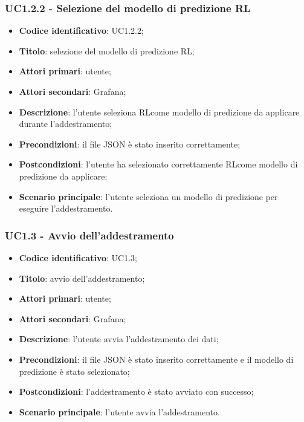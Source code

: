 \subsubsection{UC1.2.2 - Selezione del modello di predizione RL}
\begin{itemize}
	\item \textbf{Codice identificativo}: UC1.2.2;
	\item \textbf{Titolo}: selezione del modello di predizione RL\glo;
	\item \textbf{Attori primari}: utente;
	\item \textbf{Attori secondari}: Grafana\glo;
	\item \textbf{Descrizione}: l'utente seleziona RL\glosp come modello di predizione da applicare durante l'addestramento;
	\item \textbf{Precondizioni}: il file JSON è stato inserito correttamente;
	\item \textbf{Postcondizioni}: l'utente ha selezionato correttamente RL\glosp come modello di predizione da applicare;
	\item \textbf{Scenario principale}: l'utente seleziona un modello di predizione per eseguire l'addestramento.
\end{itemize}

\subsubsection{UC1.3 - Avvio dell'addestramento}
\begin{itemize}
	\item \textbf{Codice identificativo}: UC1.3;
	\item \textbf{Titolo}: avvio dell'addestramento;
	\item \textbf{Attori primari}: utente;
	\item \textbf{Attori secondari}: Grafana\glo;
	\item \textbf{Descrizione}: l'utente avvia l'addestramento dei dati;
	\item \textbf{Precondizioni}: il file JSON è stato inserito correttamente e il modello di predizione è stato selezionato;
	\item \textbf{Postcondizioni}: l'addestramento è stato avviato con successo;
	\item \textbf{Scenario principale}: l'utente avvia l'addestramento.
\end{itemize}

